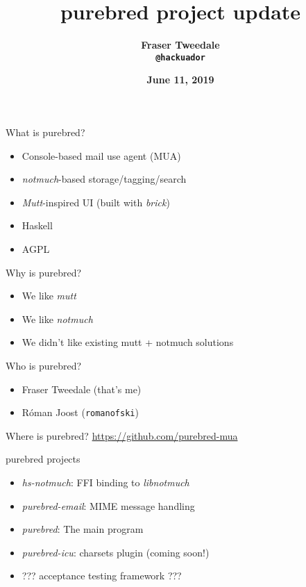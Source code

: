 \documentclass[ignorenonframetext,aspectratio=169,dvipsnames]{beamer}
\title{\Huge \bf purebred project update}
\author{\Large \bf Fraser Tweedale\\
    \texttt{@hackuador}}
\date{\large \bf June 11, 2019}
\begin{document}
\begin{frame}
\titlepage
\end{frame}

\begin{frame}{What is purebred?}
\begin{itemize}
    \item Console-based mail use agent (MUA)
    \item {\em notmuch}-based storage/tagging/search
    \item {\em Mutt}-inspired UI (built with {\em brick})
    \item Haskell
    \item AGPL
\end{itemize}
\end{frame}

\begin{frame}{Why is purebred?}
\begin{itemize}
    \item We like {\em mutt}
    \item We like {\em notmuch}
    \item We didn't like existing mutt + notmuch solutions
\end{itemize}
\end{frame}

\begin{frame}{Who is purebred?}
\begin{itemize}
    \item Fraser Tweedale (that's me)
    \item Róman Joost ({\tt romanofski})
\end{itemize}
\end{frame}

\begin{frame}{Where is purebred?}
    \centering
\LARGE \url{https://github.com/purebred-mua}
\end{frame}

\begin{frame}{purebred projects}
\begin{itemize}
    \item {\em hs-notmuch}: FFI binding to {\em libnotmuch}
    \item {\em purebred-email}: MIME message handling
    \item {\em purebred}: The main program
    \item {\em purebred-icu}: charsets plugin (coming soon!)
    \item ??? acceptance testing framework ???
\end{itemize}
\end{frame}
\end{document}
